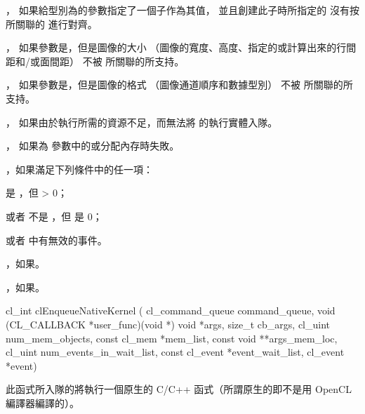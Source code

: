 \item {}，
如果給型別為的參數指定了一個子作為其值，
並且創建此子時所指定的  沒有按 
所關聯的  進行對齊。

\item {}，
如果參數是，但是圖像的大小
（圖像的寬度、高度、指定的或計算出來的行間距和/或面間距）
不被  所關聯的所支持。

\item {}，
如果參數是，但是圖像的格式
（圖像通道順序和數據型別）
不被  所關聯的所支持。

\item {}，
如果由於執行所需的資源不足，而無法將  的執行實體入隊。

\item {}，
如果為  參數中的或分配內存時失敗。

\startitem
{}，如果滿足下列條件中的任一項：
\startigBase
\item {} 是 ，但  > 0；
\item 或者  不是 ，但  是 0；
\item 或者  中有無效的事件。
\stopigBase
\stopitem

\item {}，如果\scdevfailres。

\item {}，如果\schostfailres。
\stopigBase


\startCLFUNC
cl_int clEnqueueNativeKernel (
			cl_command_queue command_queue,
			void (CL_CALLBACK *user_func)(void *)
			void *args,
			size_t cb_args,
			cl_uint num_mem_objects,
			const cl_mem *mem_list,
			const void **args_mem_loc,
			cl_uint num_events_in_wait_list,
			const cl_event *event_wait_list,
			cl_event *event)
\stopCLFUNC

此函式所入隊的將執行一個原生的 C/C++ 函式（所謂原生的即不是用 OpenCL 編譯器編譯的）。

